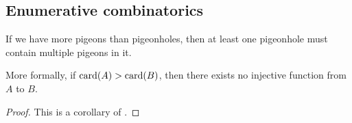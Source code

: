 \subsection{Enumerative combinatorics}\label{subsec:enumerative_combinatorics}

\begin{theorem}\label{def:pigeonhole_principle}
  If we have more pigeons than pigeonholes, then at least one pigeonhole must contain multiple pigeons in it.

  More formally, if \( \operatorname{card}(A) > \operatorname{card}(B) \), then there exists no injective function from \( A \) to \( B \).
\end{theorem}
\begin{proof}
  This is a corollary of .
\end{proof}

